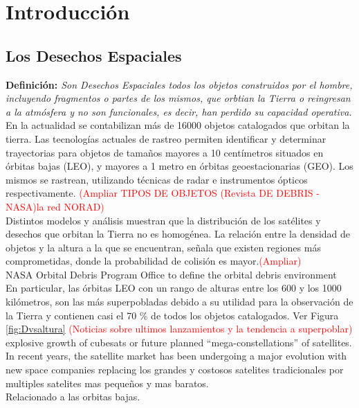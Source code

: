 \chapter{Introducción}
\label{chap:introduccion}


\section{Los Desechos Espaciales}


{\bf{Definici\'on:}}{\it{ Son Desechos Espaciales todos los objetos construidos por el hombre, incluyendo fragmentos o partes de los mismos, que orbtian la Tierra o reingresan a la atm\'osfera y no son funcionales, es decir, han perdido su capacidad operativa.}} \cite{iadcguide}\\

En la actualidad se contabilizan m\'as de 16000 objetos catalogados que orbitan la tierra. Las tecnolog\'ias actuales de rastreo permiten identificar y determinar trayectorias para objetos de tamaños mayores a 10 cent\'imetros situados en \'orbitas bajas (LEO), y mayores a 1 metro en \'orbitas geoestacionarias (GEO). Los mismos se rastrean, utilizando t\'ecnicas de radar e instrumentos \'opticos respectivamente. \textcolor{red}{(Ampliar TIPOS DE OBJETOS (Revista DE DEBRIS - NASA)la red NORAD)}\\

Distintos modelos y an\'alisis muestran que la distribuci\'on de los sat\'elites y desechos que orbitan la Tierra no es homog\'enea. La relaci\'on entre la densidad de objetos y la altura a la que se encuentran, señala que existen regiones m\'as comprometidas, donde la probabilidad de colisi\'on es mayor.\textcolor{red}{(Ampliar)}\\
NASA Orbital Debris Program Office to define the orbital debris environment\\
En particular, las \'orbitas LEO con un rango de alturas entre los 600 y los 1000 kil\'ometros, son las m\'as superpobladas debido a su utilidad para la observaci\'on de la Tierra y contienen casi el 70 \% de todos los objetos catalogados. Ver Figura \ref{fig:Dvsaltura}
\textcolor{red}{(Noticias sobre ultimos lanzamientos y la tendencia a superpoblar)} 
explosive growth of cubesats or future planned “mega-constellations” of satellites.\\
In recent years, the satellite market has been undergoing a major evolution with new space companies replacing
los grandes y costosos satelites tradicionales por multiples satelites mas pequeños y mas baratos.\\
Relacionado a las orbitas bajas.\\

